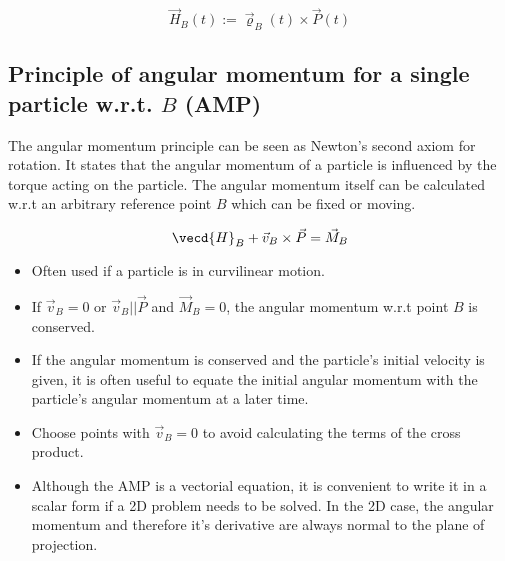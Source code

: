 \documentclass[10pt,a4paper]{scrartcl}
\begin{document}
\begin{multicols*}{2}

\begin{equation*}
\vec{H}_B(t):=\vec{\varrho}_B(t)\times\vec{P}(t)
\end{equation*}



\subsection{Principle of angular momentum for a single particle w.r.t. $B$ (AMP)}
The angular momentum principle can be seen as Newton's second axiom for rotation. It states that the angular momentum of a particle is influenced by the torque acting on the particle. The angular momentum itself can be calculated w.r.t an arbitrary reference point $B$ which can be fixed or moving.

\begin{equation*}
\vecd{H}_B+\vec{v}_B\times\vec{P} = \vec{M}_B
\end{equation*}

\begin{itemize}
\item Often used if a particle is in curvilinear motion.
\item If $\vec{v}_B =0$ or $\vec{v}_B || \vec{P}$ and $\vec{M}_B=0$, the angular momentum w.r.t point $B$ is conserved. 
\item If the angular momentum is conserved and the particle's initial velocity is given, it is often useful to equate the initial angular momentum with the particle's angular momentum at a later time. 
\item Choose points with $\vec{v}_B = 0$ to avoid calculating the terms of the cross product. 
\item Although the AMP is a vectorial equation, it is convenient to write it in a scalar form if a 2D problem needs to be solved. In the 2D case, the angular momentum and therefore it's derivative are always normal to the plane of projection.
\end{itemize}


\end{multicols*}
\end{document}
